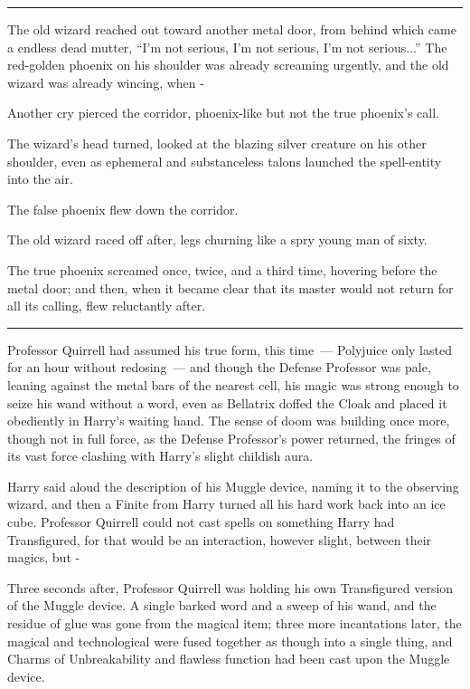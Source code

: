 \begin{center}\rule{3in}{0.4pt}\end{center}

The old wizard reached out toward another metal door, from behind which came a endless dead mutter, ``I'm not serious, I'm not serious, I'm not serious...'' The red-golden phoenix on his shoulder was already screaming urgently, and the old wizard was already wincing, when -

Another cry pierced the corridor, phoenix-like but not the true phoenix's call.

The wizard's head turned, looked at the blazing silver creature on his other shoulder, even as ephemeral and substanceless talons launched the spell-entity into the air.

The false phoenix flew down the corridor.

The old wizard raced off after, legs churning like a spry young man of sixty.

The true phoenix screamed once, twice, and a third time, hovering before the metal door; and then, when it became clear that its master would not return for all its calling, flew reluctantly after.

\begin{center}\rule{3in}{0.4pt}\end{center}

Professor Quirrell had assumed his true form, this time~--- Polyjuice only lasted for an hour without redosing~--- and though the Defense Professor was pale, leaning against the metal bars of the nearest cell, his magic was strong enough to seize his wand without a word, even as Bellatrix doffed the Cloak and placed it obediently in Harry's waiting hand. The sense of doom was building once more, though not in full force, as the Defense Professor's power returned, the fringes of its vast force clashing with Harry's slight childish aura.

Harry said aloud the description of his Muggle device, naming it to the observing wizard, and then a Finite from Harry turned all his hard work back into an ice cube. Professor Quirrell could not cast spells on something Harry had Transfigured, for that would be an interaction, however slight, between their magics, but -

Three seconds after, Professor Quirrell was holding his own Transfigured version of the Muggle device. A single barked word and a sweep of his wand, and the residue of glue was gone from the magical item; three more incantations later, the magical and technological were fused together as though into a single thing, and Charms of Unbreakability and flawless function had been cast upon the Muggle device.

